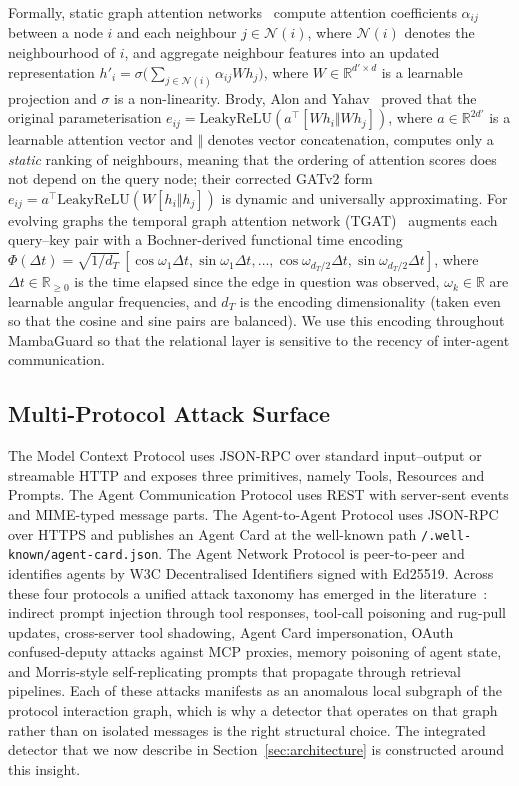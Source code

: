 \documentclass[journal,10pt,twocolumn]{IEEEtran}
\newcommand{\R}{\mathbb{R}}
\newcommand{\calN}{\mathcal{N}}
\begin{document}
Formally, static graph attention networks~\cite{Velickovic2018GAT} compute attention coefficients $\alpha_{ij}$ between a node $i$ and each neighbour $j\in\calN(i)$, where $\calN(i)$ denotes the neighbourhood of $i$, and aggregate neighbour features into an updated representation $h'_{i}=\sigma\bigl(\sum_{j\in\calN(i)}\alpha_{ij}Wh_{j}\bigr)$, where $W\in\R^{d'\times d}$ is a learnable projection and $\sigma$ is a non-linearity. Brody, Alon and Yahav~\cite{Brody2022GATv2} proved that the original parameterisation $e_{ij}=\mathrm{LeakyReLU}(a^{\top}[Wh_{i}\Vert Wh_{j}])$, where $a\in\R^{2d'}$ is a learnable attention vector and $\Vert$ denotes vector concatenation, computes only a \emph{static} ranking of neighbours, meaning that the ordering of attention scores does not depend on the query node; their corrected GATv2 form $e_{ij}=a^{\top}\mathrm{LeakyReLU}(W[h_{i}\Vert h_{j}])$ is dynamic and universally approximating. For evolving graphs the temporal graph attention network (TGAT)~\cite{Xu2020TGAT} augments each query--key pair with a Bochner-derived functional time encoding $\Phi(\Delta t)=\sqrt{1/d_{T}}\,[\cos\omega_{1}\Delta t,\sin\omega_{1}\Delta t,\ldots,\cos\omega_{d_{T}/2}\Delta t,\sin\omega_{d_{T}/2}\Delta t]$, where $\Delta t\in\R_{\ge 0}$ is the time elapsed since the edge in question was observed, $\omega_{k}\in\R$ are learnable angular frequencies, and $d_{T}$ is the encoding dimensionality (taken even so that the cosine and sine pairs are balanced). We use this encoding throughout MambaGuard so that the relational layer is sensitive to the recency of inter-agent communication.

\subsection{Multi-Protocol Attack Surface}
The Model Context Protocol uses JSON-RPC over standard input--output or streamable HTTP and exposes three primitives, namely Tools, Resources and Prompts. The Agent Communication Protocol uses REST with server-sent events and MIME-typed message parts. The Agent-to-Agent Protocol uses JSON-RPC over HTTPS and publishes an Agent Card at the well-known path \texttt{/.well-known/agent-card.json}. The Agent Network Protocol is peer-to-peer and identifies agents by W3C Decentralised Identifiers signed with Ed25519. Across these four protocols a unified attack taxonomy has emerged in the literature~\cite{Hou2025MCP,Habler2025A2A,Narajala2025A2A,Wang2025AgentArmor}: indirect prompt injection through tool responses, tool-call poisoning and rug-pull updates, cross-server tool shadowing, Agent Card impersonation, OAuth confused-deputy attacks against MCP proxies, memory poisoning of agent state, and Morris-style self-replicating prompts that propagate through retrieval pipelines. Each of these attacks manifests as an anomalous local subgraph of the protocol interaction graph, which is why a detector that operates on that graph rather than on isolated messages is the right structural choice. The integrated detector that we now describe in Section~\ref{sec:architecture} is constructed around this insight.
\end{document}
